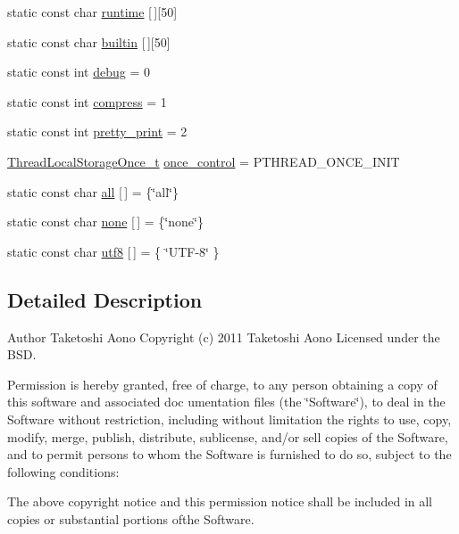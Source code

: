 \begin{DoxyCompactItemize}
\item 
static const char \hyperlink{namespacemocha_a3ebf6f54b4e4fa156c76f20a1b67094e}{runtime} \mbox{[}$\,$\mbox{]}\mbox{[}50\mbox{]}
\item 
static const char \hyperlink{namespacemocha_ab9af324926667c55b1daeaa0e79aaacb}{builtin} \mbox{[}$\,$\mbox{]}\mbox{[}50\mbox{]}
\item 
static const int \hyperlink{namespacemocha_a6bb78f44a293fcc09ca593657bf9326c}{debug} = 0
\item 
static const int \hyperlink{namespacemocha_a0e2da4823a390683f811a74c74b39905}{compress} = 1
\item 
static const int \hyperlink{namespacemocha_a0a9e708642adfe9936eab588e538966a}{pretty\_\-print} = 2
\item 
\hyperlink{namespacemocha_ada647d8e6d9802c8b822352d3f257e15}{ThreadLocalStorageOnce\_\-t} \hyperlink{namespacemocha_a0c44d2795b49b8b8b69a9ce4945bdeec}{once\_\-control} = PTHREAD\_\-ONCE\_\-INIT
\item 
static const char \hyperlink{namespacemocha_ab7c1f20796053116d2464c77f1095528}{all} \mbox{[}$\,$\mbox{]} = \{\char`\"{}all\char`\"{}\}
\item 
static const char \hyperlink{namespacemocha_a41c47432f901b513e9caefbcb4a96f1f}{none} \mbox{[}$\,$\mbox{]} = \{\char`\"{}none\char`\"{}\}
\item 
static const char \hyperlink{namespacemocha_ae15376d73de0562542f55fee7bab227d}{utf8} \mbox{[}$\,$\mbox{]} = \{ \char`\"{}UTF-\/8\char`\"{} \}
\end{DoxyCompactItemize}


\subsection{Detailed Description}
\begin{DoxyAuthor}{Author}
Taketoshi Aono   Copyright (c) 2011 Taketoshi Aono Licensed under the BSD.
\end{DoxyAuthor}
Permission is hereby granted, free of charge, to any person obtaining a copy of this software and associated doc umentation files (the \char`\"{}Software\char`\"{}), to deal in the Software without restriction, including without limitation the rights to use, copy, modify, merge, publish, distribute, sublicense, and/or sell copies of the Software, and to permit persons to whom the Software is furnished to do so, subject to the following conditions:

The above copyright notice and this permission notice shall be included in all copies or substantial portions ofthe Software.

